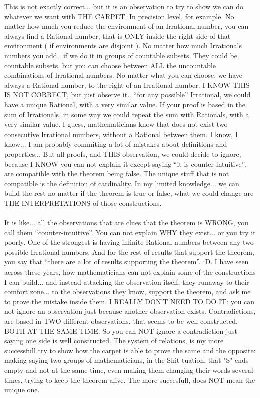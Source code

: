 		\noindent
		This is not exactly correct... but it is an observation to try to show we can do whatever we want with THE CARPET. In precision level, for example. No matter how much you reduce the environment of an Irrational number, you can always find a Rational number, that is ONLY inside the right side of that environment ( if environments are disjoint ). No matter how much Irrationals numbers you add.. if we do it in groups of countable subsets. They could be countable subsets, but you can choose between ALL the uncountable combinations of Irrational numbers. No matter what you can choose, we have always a Rational number, to the right of an Irrational number. I KNOW THIS IS NOT CORRECT, but just observe it.. ``for any possible'' Irrational, we could have a unique Rational, with a very similar value. If your proof is based in the sum of Irrationals, in some way we could repeat the sum with Rationals, with a very similar value. I guess, mathematicians know that does not exist two consecutive Irrational numbers, without a Rational between them. I know, I know... I am probably commiting a lot of mistakes about definitions and properties... But all proofs, and THIS observation, we could decide to ignore, because I KNOW you can not explain it except saying ``it is counter-intuitive'', are compatible with the theorem being false. The unique stuff that is not compatible is the definition of cardinality. In my limited knowledge... we can build the rest no matter if the theorem is true or false, what we could change are THE INTERPRETATIONS of those constructions.
		\\\\
		
		\noindent
		It is like... all the observations that are clues that the theorem is WRONG, you call them ``counter-intuitive''. You can not explain WHY they exist... or you try it poorly. One of the strongest is having infinite Rational numbers between any two possible Irrational numbers. And for the rest of results that support the theorem, you say that ``there are a lot of results supporting the theorem''. :D. I have seen across these years, how mathematicians can not explain some of the constructions I can build... and instead attacking the observation itself, they runaway to their comfort zone... to the observations they know, support the theorem, and ask me to prove the mistake inside them. I REALLY DON'T NEED TO DO IT: you can not ignore an observation just because another observation exists. Contradictions, are based in TWO different observations, that seems to be well constructed. BOTH AT THE SAME TIME. So you can NOT ignore a contradiction just saying one side is well constructed. The system of relations, is my more successfull try to show how the carpet is able to prove the same and the opposite: making saying two groups of mathematicians, in the Shit-tuation, that "S" ends empty and not at the same time, even making them changing their words several times, trying to keep the theorem alive. The more succesfull, does NOT mean the unique one.
		\\\\
		
